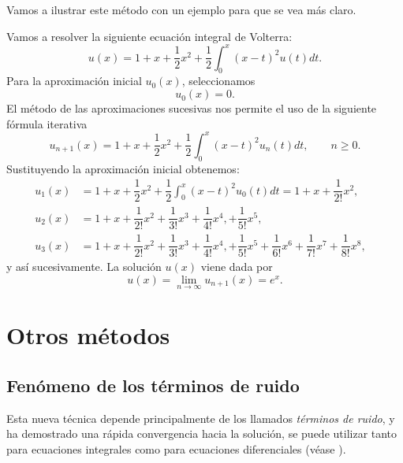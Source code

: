 Vamos a ilustrar este método con un ejemplo para que se vea más claro.
\begin{ejemplo}
	Vamos a resolver la siguiente ecuación integral de Volterra:
	\begin{equation}
		u(x) = 1 + x + \dfrac{1}{2}x^2 + \dfrac{1}{2}\int_{0}^{x}(x-t)^2u(t)dt.
	\end{equation}
	Para la aproximación inicial $u_0(x)$, seleccionamos
	\begin{equation}
		u_0(x) = 0.
	\end{equation}
	El método de las aproximaciones sucesivas nos permite el uso de la siguiente fórmula iterativa
	\begin{equation}
		u_{n+1}(x) = 1 + x + \dfrac{1}{2}x^2 + \dfrac{1}{2}\int_{0}^{x}(x-t)^2u_n(t)dt, \qquad n \geqslant 0.
	\end{equation}
	Sustituyendo la aproximación inicial obtenemos:
	\begin{align}
		u_1(x) &= 1 + x + \dfrac{1}{2}x^2 + \dfrac{1}{2}\int_{0}^{x}(x-t)^2u_0(t)dt = 1 + x + \dfrac{1}{2!}x^2,   & \\
		u_2(x) &= 1 + x + \dfrac{1}{2!}x^2 + \dfrac{1}{3!}x^3 + \dfrac{1}{4!}x^4, + \dfrac{1}{5!}x^5,   & \\
		u_3(x) &= 1 + x + \dfrac{1}{2!}x^2 + \dfrac{1}{3!}x^3 + \dfrac{1}{4!}x^4, + \dfrac{1}{5!}x^5 + \dfrac{1}{6!}x^6 + \dfrac{1}{7!}x^7 + \dfrac{1}{8!}x^8,     &
	\end{align}
	y así sucesivamente. La solución $u(x)$ viene dada por
	\begin{equation}
		u(x) = \lim_{n \rightarrow \infty} u_{n+1}(x) = e^x.
	\end{equation}
\end{ejemplo}

\section{Otros métodos}

\subsection{Fenómeno de los términos de ruido}
Esta nueva técnica depende principalmente de los llamados \textit{términos de ruido}, y ha demostrado una rápida convergencia hacia la solución, se puede utilizar tanto para ecuaciones integrales como para ecuaciones diferenciales (véase \cite{WazWaz}).

